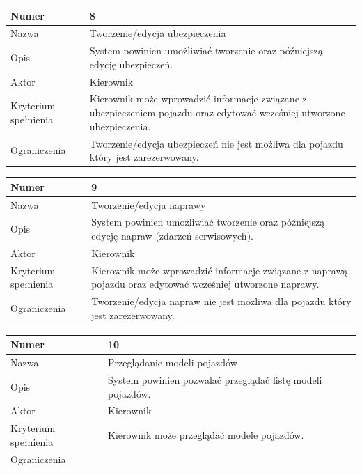 \documentclass[eng,printmode,openany]{mgr}
\begin{document}
	\begin{table}[H]
		\begin{tabularx}{\textwidth}{|l|X|}
			\hline
			Numer                & 8  \\ \hline
			Nazwa                & Tworzenie/edycja ubezpieczenia \\ \hline
			Opis                 & System powinien umożliwiać tworzenie oraz późniejszą edycję ubezpieczeń. \\ \hline
			Aktor                & Kierownik \\ \hline
			Kryterium spełnienia & Kierownik może wprowadzić informacje związane z ubezpieczeniem pojazdu oraz edytować wcześniej utworzone ubezpieczenia. \\ \hline
			Ograniczenia         & Tworzenie/edycja ubezpieczeń nie jest możliwa dla pojazdu który jest zarezerwowany. \\ \hline
		\end{tabularx}
	\end{table}	

	\begin{table}[H]
		\begin{tabularx}{\textwidth}{|l|X|}
			\hline
			Numer                & 9  \\ \hline
			Nazwa                & Tworzenie/edycja naprawy \\ \hline
			Opis                 & System powinien umożliwiać tworzenie oraz późniejszą edycję napraw (zdarzeń serwisowych). \\ \hline
			Aktor                & Kierownik \\ \hline
			Kryterium spełnienia & Kierownik może wprowadzić informacje związane z naprawą pojazdu oraz edytować wcześniej utworzone naprawy. \\ \hline
			Ograniczenia         & Tworzenie/edycja napraw nie jest możliwa dla pojazdu który jest zarezerwowany. \\ \hline
		\end{tabularx}
	\end{table}	

	\begin{table}[H]
		\begin{tabularx}{\textwidth}{|l|X|}
			\hline
			Numer                & 10  \\ \hline
			Nazwa                & Przeglądanie modeli pojazdów \\ \hline
			Opis                 & System powinien pozwalać przeglądać listę modeli pojazdów. \\ \hline
			Aktor                & Kierownik \\ \hline
			Kryterium spełnienia & Kierownik może przeglądać modele pojazdów. \\ \hline
			Ograniczenia         & \\ \hline
		\end{tabularx}
	\end{table}	
\end{document}
